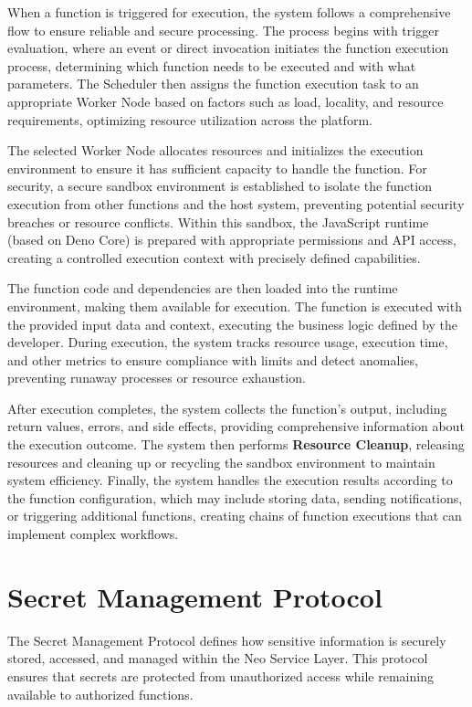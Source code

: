 \documentclass[11pt]{article}
\begin{document}
When a function is triggered for execution, the system follows a comprehensive flow to ensure reliable and secure processing. The process begins with trigger evaluation, where an event or direct invocation initiates the function execution process, determining which function needs to be executed and with what parameters. The Scheduler then assigns the function execution task to an appropriate Worker Node based on factors such as load, locality, and resource requirements, optimizing resource utilization across the platform.

The selected Worker Node allocates resources and initializes the execution environment to ensure it has sufficient capacity to handle the function. For security, a secure sandbox environment is established to isolate the function execution from other functions and the host system, preventing potential security breaches or resource conflicts. Within this sandbox, the JavaScript runtime (based on Deno Core) is prepared with appropriate permissions and API access, creating a controlled execution context with precisely defined capabilities.

The function code and dependencies are then loaded into the runtime environment, making them available for execution. The function is executed with the provided input data and context, executing the business logic defined by the developer. During execution, the system tracks resource usage, execution time, and other metrics to ensure compliance with limits and detect anomalies, preventing runaway processes or resource exhaustion.

After execution completes, the system collects the function's output, including return values, errors, and side effects, providing comprehensive information about the execution outcome. The system then performs \textbf{Resource Cleanup}, releasing resources and cleaning up or recycling the sandbox environment to maintain system efficiency. Finally, the system handles the execution results according to the function configuration, which may include storing data, sending notifications, or triggering additional functions, creating chains of function executions that can implement complex workflows.

\section{Secret Management Protocol}
\label{subsec:secret-protocol-spec}

The Secret Management Protocol defines how sensitive information is securely stored, accessed, and managed within the Neo Service Layer. This protocol ensures that secrets are protected from unauthorized access while remaining available to authorized functions.
\end{document}
